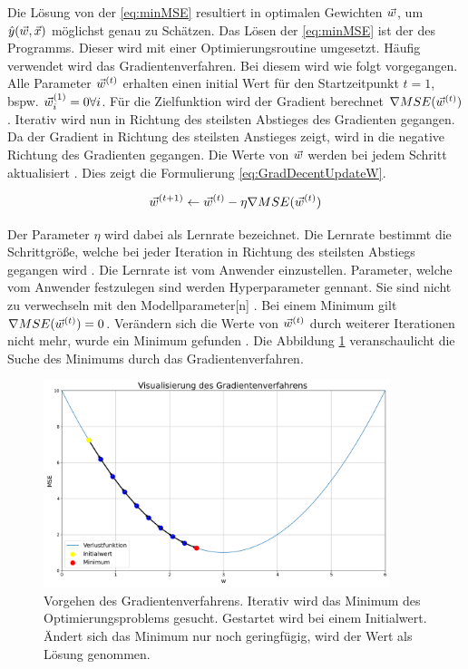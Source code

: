 Die Lösung von der \autoref{eq:minMSE} resultiert in optimalen Gewichten \(\vec{w}\), um \(\hat{y}(\vec{w}, \vec{x})\) möglichst genau zu Schätzen. Das Lösen der \autoref{eq:minMSE} ist der  des Programms. Dieser wird mit einer Optimierungsroutine umgesetzt. Häufig verwendet wird das \gls{Gradientenverfahren}. Bei diesem wird wie folgt vorgegangen. Alle Parameter \(\vec{w}^{(t)}\) erhalten einen initial Wert für den Startzeitpunkt \(t=1\), bspw. \(\vec{w}_i^{(1)}=0 \forall i\). Für die \gls{Zielfunktion} wird der Gradient berechnet \(\nabla MSE(\vec{w}^{(t)})\). Iterativ wird nun in Richtung des steilsten Abstieges des Gradienten gegangen. Da der Gradient in Richtung des steilsten Anstieges zeigt, wird in die negative Richtung des Gradienten gegangen. Die Werte von \(\vec{w}\) werden bei jedem Schritt aktualisiert \cite{Mitchell.1997, Goodfellow.2016, ShalevShwartz.2014}. Dies zeigt die Formulierung \ref{eq:GradDecentUpdateW}.

\begin{equation}
    \label{eq:GradDecentUpdateW}
    \vec{w}^{(t+1)} \leftarrow \vec{w}^{(t)} - \eta\nabla MSE(\vec{w}^{(t)})
\end{equation}

Der Parameter \(\eta\) wird dabei als Lernrate bezeichnet. Die Lernrate bestimmt die Schrittgröße, welche bei jeder Iteration in Richtung des steilsten Abstiegs gegangen wird \cite{Mitchell.1997}. Die Lernrate ist vom Anwender einzustellen. Parameter, welche vom Anwender festzulegen sind werden \gls{Hyperparameter} gennant. Sie sind nicht zu verwechseln mit den \gls{Modellparameter}[n] \cite{Zheng.2015}. Bei einem Minimum gilt \(\nabla MSE(\vec{w}^{(t)}) = 0\). Verändern sich die Werte von \(\vec{w}^{(t)}\) durch weiterer Iterationen nicht mehr, wurde ein Minimum gefunden \cite{Goodfellow.2016, Burkov.2019}. Die Abbildung \ref{fig:GradDecentBsp} veranschaulicht die Suche des Minimums durch das \gls{Gradientenverfahren}.

\begin{figure}[htb]
    \centering
    \includegraphics[width=0.9\textwidth]{img/Plots/Gradientverfahren.png}
    \caption[Vorgehen des Gradientenverfahrens.]{Vorgehen des Gradientenverfahrens. Iterativ wird das Minimum des Optimierungsproblems gesucht. Gestartet wird bei einem Initialwert. Ändert sich das Minimum nur noch geringfügig, wird der Wert als Lösung genommen.}
    \label{fig:GradDecentBsp}
\end{figure}

